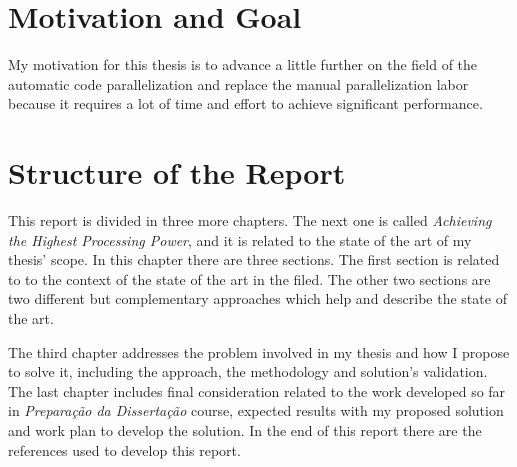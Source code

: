 
\section{Motivation and Goal} \label{sec:goals}

My motivation for this thesis is to advance a little further on the field of the automatic code parallelization  and replace the manual parallelization labor because it requires a lot of time and effort to achieve significant performance.


\section{Structure of the Report} \label{sec:struct}


This report is divided in three more chapters. The next one is called \textit{Achieving the Highest Processing Power}, and it is related to the state of the art of my thesis' scope. In this chapter there are three sections. The first section is related to to the context of the state of the art in the filed. The other two sections are two different but complementary approaches which help and describe the state of the art. 

The third chapter addresses the problem involved in my thesis and how I propose to solve it, including the approach, the methodology and solution's validation. The last chapter  includes final consideration related to the work developed so far in \textit{Preparação da Dissertação} course, expected results with my proposed solution and work plan to develop the solution. In the end of this report there are the references used to develop this report.
